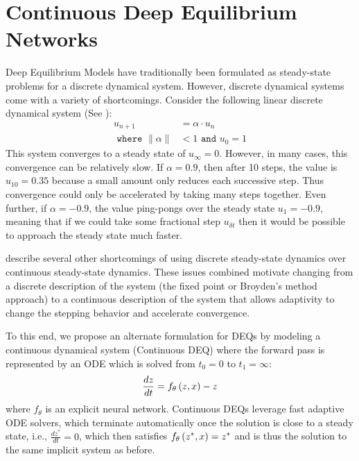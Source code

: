 
\section{Continuous Deep Equilibrium Networks}
\label{sec:continuous_deqs}

Deep Equilibrium Models have traditionally been formulated as steady-state problems for a discrete dynamical system. However, discrete dynamical systems come with a variety of shortcomings. Consider the following linear discrete dynamical system (See ):
%
\begin{align}
    u_{n + 1}                   & = \alpha \cdot u_n         \\
    \texttt{ where } \|\alpha\| & < 1 \texttt{ and } u_0 = 1
\end{align}
%
This system converges to a steady state of $u_\infty = 0$. However, in many cases, this convergence can be relatively slow. If $\alpha = 0.9$, then after 10 steps, the value is $u_{10} = 0.35$ because a small amount only reduces each successive step. Thus convergence could only be accelerated by taking many steps together. Even further, if $\alpha = -0.9$, the value ping-pongs over the steady state $u_{1} = -0.9$, meaning that if we could take some fractional step $u_{\delta t}$ then it would be possible to approach the steady state much faster.


\citet{rico1992discrete, bulsari1995neural} describe several other shortcomings of using discrete steady-state dynamics over continuous steady-state dynamics. These issues combined motivate changing from a discrete description of the system (the fixed point or Broyden's method approach) to a continuous description of the system that allows adaptivity to change the stepping behavior and accelerate convergence.

To this end, we propose an alternate formulation for DEQs by modeling a continuous dynamical system (Continuous DEQ) where the forward pass is represented by an ODE which is solved from $t_0 = 0$ to $t_1 = \infty$:
%
\begin{equation}
    \frac{dz}{dt} = f_\theta\left(z, x\right) - z
\end{equation}
%
where $f_\theta$ is an explicit neural network. Continuous DEQs leverage fast adaptive ODE solvers, which terminate automatically once the solution is close to a steady state, i.e., $\frac{dz^*}{dt} = 0$, which then satisfies $f_\theta\left(z^*, x\right) = z^*$ and is thus the solution to the same implicit system as before.

